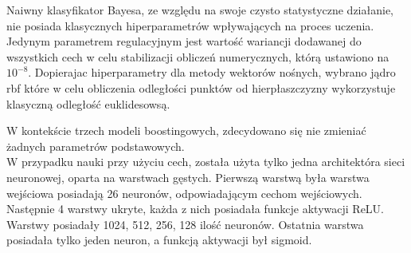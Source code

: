 \documentclass[a4paper,twoside,12pt]{book}
\begin{document}
Naiwny klasyfikator Bayesa, ze względu na swoje czysto statystyczne działanie, nie posiada klasycznych hiperparametrów wpływających na proces uczenia. Jedynym parametrem regulacyjnym jest wartość wariancji dodawanej do wszystkich cech w celu stabilizacji obliczeń numerycznych, którą ustawiono na $10^{-8}$.
Dopierajac hiperparametry dla metody wektorów nośnych, wybrano jądro rbf które w celu obliczenia odległości punktów od hierpłaszczyzny wykorzystuje klasyczną odległość euklidesowsą.

W kontekście trzech modeli boostingowych, zdecydowano się nie zmieniać żadnych parametrów podstawowych.\\

W przypadku nauki przy użyciu cech, została użyta tylko jedna architektóra sieci neuronowej, oparta na warstwach gęstych. Pierwszą warstwą była warstwa wejściowa posiadają 26 neuronów, odpowiadającym cechom wejściowych. Następnie 4 warstwy ukryte, każda z nich posiadała funkcje aktywacji ReLU. Warstwy posiadały 1024, 512, 256, 128 ilość neuronów. Ostatnia warstwa posiadała tylko jeden neuron, a funkcją aktywacji był sigmoid.
\end{document}
